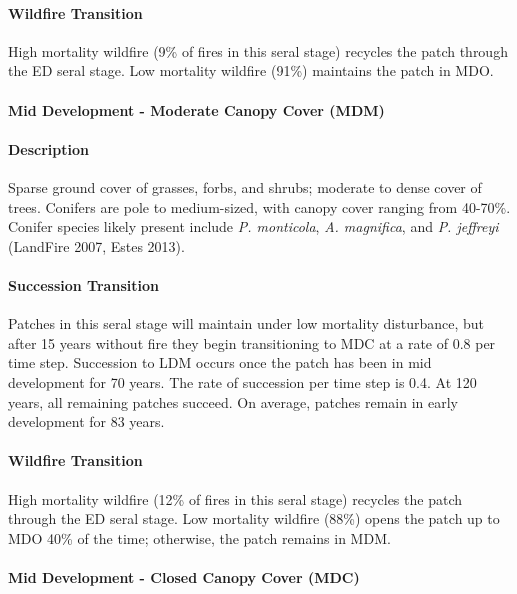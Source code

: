 \paragraph*{Wildfire Transition} High mortality wildfire (9\% of fires in this seral stage) recycles the patch through the ED seral stage. Low mortality wildfire (91\%) maintains the patch in MDO.

\noindent\hrulefill

\paragraph*{Mid Development - Moderate Canopy Cover (MDM)}

\paragraph*{Description} Sparse ground cover of grasses, forbs, and shrubs; moderate to dense cover of trees. Conifers are pole to medium-sized, with canopy cover ranging from 40-70\%. Conifer species likely present include \emph{P. monticola}, \emph{A. magnifica}, and \emph{P. jeffreyi} (LandFire 2007, Estes 2013).

\paragraph*{Succession Transition} Patches in this seral stage will maintain under low mortality disturbance, but after 15 years without fire they begin transitioning to MDC at a rate of 0.8 per time step. Succession to LDM occurs once the patch has been in mid development for 70 years. The rate of succession per time step is 0.4. At 120 years, all remaining patches succeed. On average, patches remain in early development for 83 years.

\paragraph*{Wildfire Transition} High mortality wildfire (12\% of fires in this seral stage) recycles the patch through the ED seral stage. Low mortality wildfire (88\%) opens the patch up to MDO 40\% of the time; otherwise, the patch remains in MDM.

\noindent\hrulefill

\paragraph*{Mid Development - Closed Canopy Cover (MDC)}

